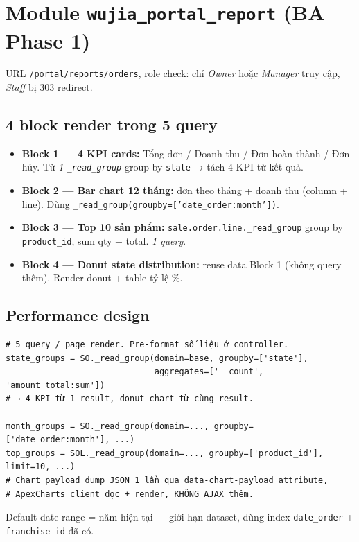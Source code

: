 \section{Module \texttt{wujia\_portal\_report} (BA Phase 1)}

URL \texttt{/portal/reports/orders}, role check: chỉ \emph{Owner} hoặc \emph{Manager} truy cập, \emph{Staff} bị 303 redirect.

\subsection{4 block render trong 5 query}

\begin{itemize}
    \item \textbf{Block 1 --- 4 KPI cards:} Tổng đơn / Doanh thu / Đơn hoàn thành / Đơn hủy. Từ \emph{1 \texttt{\_read\_group}} group by \texttt{state} → tách 4 KPI từ kết quả.
    \item \textbf{Block 2 --- Bar chart 12 tháng:} đơn theo tháng + doanh thu (column + line). Dùng \texttt{\_read\_group(groupby=['date\_order:month'])}.
    \item \textbf{Block 3 --- Top 10 sản phẩm:} \texttt{sale.order.line.\_read\_group} group by \texttt{product\_id}, sum qty + total. \emph{1 query}.
    \item \textbf{Block 4 --- Donut state distribution:} reuse data Block 1 (không query thêm). Render donut + table tỷ lệ \%.
\end{itemize}

\subsection{Performance design}

\begin{lstlisting}[style=python]
# 5 query / page render. Pre-format số liệu ở controller.
state_groups = SO._read_group(domain=base, groupby=['state'],
                              aggregates=['__count', 'amount_total:sum'])
# → 4 KPI từ 1 result, donut chart từ cùng result.

month_groups = SO._read_group(domain=..., groupby=['date_order:month'], ...)
top_groups = SOL._read_group(domain=..., groupby=['product_id'], limit=10, ...)
# Chart payload dump JSON 1 lần qua data-chart-payload attribute,
# ApexCharts client đọc + render, KHÔNG AJAX thêm.
\end{lstlisting}

Default date range = năm hiện tại — giới hạn dataset, dùng index \texttt{date\_order} + \texttt{franchise\_id} đã có.

